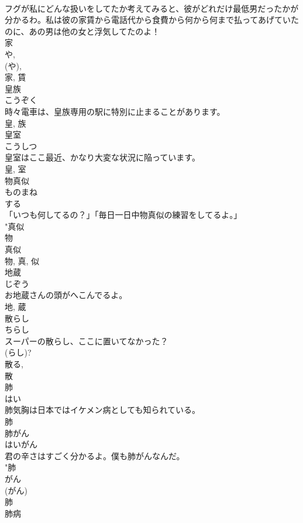 \documentclass[8pt]{extreport}
\begin{document}
\begin{CJK}{UTF8}{min}
\\	フグが私にどんな扱いをしてたか考えてみると、彼がどれだけ最低男だったかが分かるわ。私は彼の家賃から電話代から食費から何から何まで払ってあげていたのに、あの男は他の女と浮気してたのよ！	
\\	家 
\\	や, 
\\	(や), 
\\	家, 賃	
\\	皇族	
\\	こうぞく	
\\	時々電車は、皇族専用の駅に特別に止まることがあります。	
\\	皇, 族	
\\	皇室	
\\	こうしつ	
\\	皇室はここ最近、かなり大変な状況に陥っています。	
\\	皇, 室	
\\	物真似	
\\	ものまね	
\\	する 
\\	「いつも何してるの？」「毎日一日中物真似の練習をしてるよ。」	
\\	"真似 
\\	物 
\\	真似 
\\	物, 真, 似	
\\	地蔵	
\\	じぞう	
\\	お地蔵さんの頭がへこんでるよ。	
\\	地, 蔵	
\\	散らし	
\\	ちらし	
\\	スーパーの散らし、ここに置いてなかった？	
\\	(らし)? 
\\	散る, 
\\	散	
\\	肺	
\\	はい	
\\	肺気胸は日本ではイケメン病としても知られている。	
\\	肺	
\\	肺がん	
\\	はいがん	
\\	君の辛さはすごく分かるよ。僕も肺がんなんだ。	
\\	"肺 
\\	がん 
\\	(がん) 
\\	肺	
\\	肺病	

\end{CJK}
\end{document}
